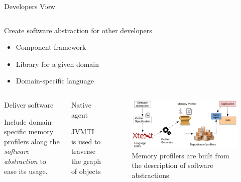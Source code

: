 \documentclass[10pt,xcolor={dvipsnames}]{beamer}
\begin{document}
	\begin{frame}{Developers View}
		\begin{columns}
			\begin{block}{Create software abstraction for other developers}
				\begin{scriptsize}
					\begin{itemize}
						\item Component framework
						\item Library for a given domain
						\item Domain-specific language
					\end{itemize}
				\end{scriptsize}
			\end{block}
		\end{columns}
		\begin{columns}
			\column{0.25\textwidth}
			\begin{block}{Deliver software}
				\begin{scriptsize}
					Include domain-specific memory profilers along the \textit{software abstraction} to ease its usage.
				\end{scriptsize}
			\end{block}
			
			\begin{alertblock}{Native agent}
				\begin{scriptsize}
					JVMTI is used to traverse the graph of objects\\
				\end{scriptsize}
			\end{alertblock}
			\column{0.65\textwidth}
			
			\begin{figure}
				\hfill
				\includegraphics[scale=0.3]{../chapter6/fig/developer-profiler-view.png}
				\vspace{-.3cm}
				\caption{\scriptsize Memory profilers are built from the description of software abstractions}
			\end{figure}
		\end{columns}
	\end{frame}
	
\end{document}

